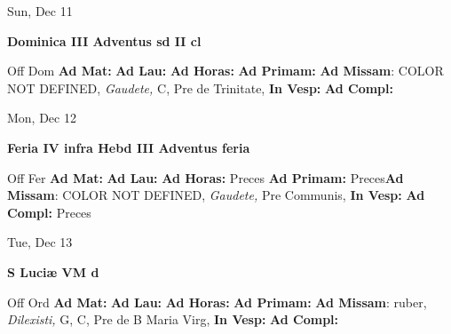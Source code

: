 \documentclass[10pt]{book}
\begin{document}
\begin{center}
\begin{minipage}{3.5in}
\vspace{2em}
\begin{center}Sun, Dec 11
\end{center}
\textbf{ \large Dominica III Adventus
\textnormal{\normalsize sd II cl}}

\begin{justify}Off Dom
\textbf{Ad Mat: }
\textbf{Ad Lau: }
\textbf{Ad Horas: }
\textbf{Ad Primam: }\textbf{Ad Missam}: COLOR NOT DEFINED, \textit{Gaudete,} C, Pre de Trinitate, 
\textbf{In Vesp: }
\textbf{Ad Compl: }
\end{justify}
\end{minipage}
\end{center}

\begin{center}
\begin{minipage}{3.5in}
\vspace{2em}
\begin{center}Mon, Dec 12
\end{center}
\textbf{ \large Feria IV infra Hebd III Adventus
\textnormal{\normalsize feria}}

\begin{justify}Off Fer
\textbf{Ad Mat: }
\textbf{Ad Lau: }
\textbf{Ad Horas: }Preces
\textbf{Ad Primam: }Preces\textbf{Ad Missam}: COLOR NOT DEFINED, \textit{Gaudete,} Pre Communis, 
\textbf{In Vesp: }
\textbf{Ad Compl: }Preces
\end{justify}
\end{minipage}
\end{center}

\begin{center}
\begin{minipage}{3.5in}
\vspace{2em}
\begin{center}Tue, Dec 13
\end{center}
\textbf{ \large S Luciæ VM
\textnormal{\normalsize d}}

\begin{justify}Off Ord
\textbf{Ad Mat: }
\textbf{Ad Lau: }
\textbf{Ad Horas: }
\textbf{Ad Primam: }\textbf{Ad Missam}: ruber, \textit{Dilexisti,} G, C, Pre de B Maria Virg, 
\textbf{In Vesp: }
\textbf{Ad Compl: }
\end{justify}
\end{minipage}
\end{center}
\end{document}
